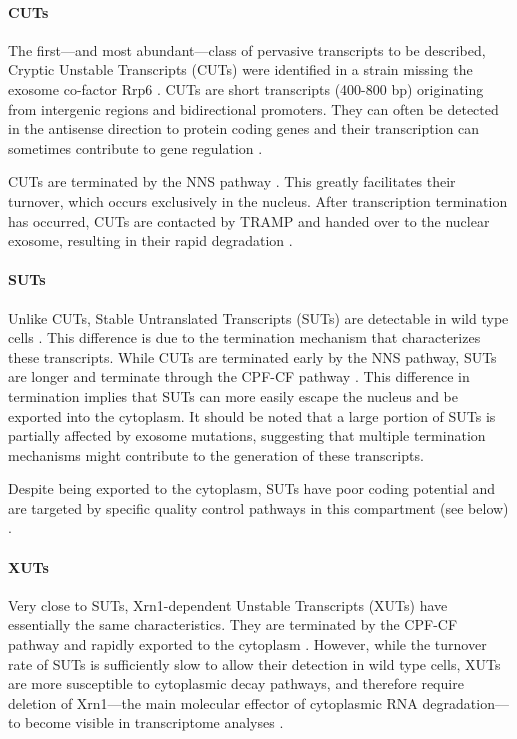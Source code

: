 \paragraph{CUTs}

The first—and most abundant—class of pervasive transcripts to be described, Cryptic Unstable Transcripts (CUTs) were identified in a strain missing the exosome co-factor Rrp6 \cite{wyers:2005:cryptic}. 
CUTs are short transcripts (400-800 bp) originating from intergenic regions and bidirectional promoters.
They can often be detected in the antisense direction to protein coding genes and their transcription can sometimes contribute to gene regulation \cite{arigo:2006:termination}. 

CUTs are terminated by the NNS pathway \cite{arigo:2006:regulation}. 
This greatly facilitates their turnover, which occurs exclusively in the nucleus. 
After transcription termination has occurred, CUTs are contacted by TRAMP and handed over to the nuclear exosome, resulting in their rapid degradation \cite{thiebaut:2006:transcription}.

\paragraph{SUTs}

Unlike CUTs, Stable Untranslated Transcripts (SUTs) are detectable in wild type cells \cite{david:2006:highresolution}. 
This difference is due to the termination mechanism that characterizes these transcripts. While CUTs are terminated early by the NNS pathway, SUTs are longer and terminate through the CPF-CF pathway \cite{marquardt:2011:distinct}. 
This difference in termination implies that SUTs can more easily escape the nucleus and be exported into the cytoplasm. 
It should be noted that a large portion of SUTs is partially affected by exosome mutations, suggesting that multiple termination mechanisms might contribute to the generation of these transcripts. 

Despite being exported to the cytoplasm, SUTs have poor coding potential and are targeted by specific quality control pathways in this compartment (see below) \cite{malabat:2015:quality}.

\paragraph{XUTs}

Very close to SUTs, Xrn1-dependent Unstable Transcripts (XUTs) have essentially the same characteristics.
They are terminated by the CPF-CF pathway and rapidly exported to the cytoplasm \cite{vandijk:2011:xuts}. 
However, while the turnover rate of SUTs is sufficiently slow to allow their detection in wild type cells, XUTs are more susceptible to cytoplasmic decay pathways, and therefore require deletion of Xrn1—the main molecular effector of cytoplasmic RNA degradation—to become visible in transcriptome analyses \cite{vandijk:2011:xuts}.


